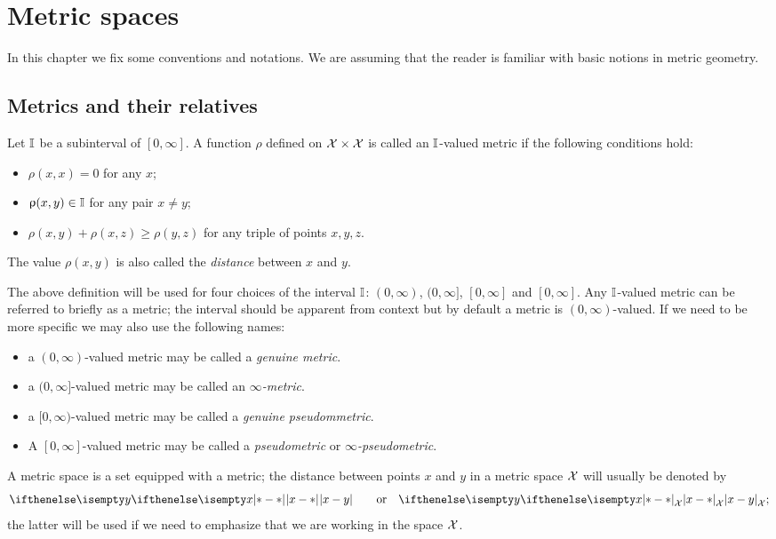 \chapter{Metric spaces}
In this chapter we fix some conventions and notations. We are assuming that the reader is familiar with basic notions in metric geometry.

\section{Metrics and their relatives}
\label{sec:metric spaces}

Let $\mathbb{I}$ be a subinterval of $[0,\infty]$.
A function $\rho$ defined on $\spc{X}\times\spc{X}$ is called an $\mathbb{I}$-valued metric if the following conditions hold:
\begin{itemize}
 \item $\rho(x,x)=0$ for any $x$;
 \item $\rho(x,y)\in \II$ for any pair $x\ne y$;
 \item $\rho(x,y)+\rho(x,z)\ge \rho(y,z)$ for any triple of points $x,y, z$.
\end{itemize}
The value $\rho(x,y)$ is also called the \emph{distance} between $x$ and $y$.


The above definition will be used for four choices of the interval $\mathbb{I}$: $(0,\infty)$, $(0,\infty]$, $[0,\infty]$ and $[0,\infty]$.
Any $\mathbb{I}$-valued metric can be referred to briefly as a metric;
the interval should be apparent from context but by default a metric is $(0,\infty)$-valued. 
If we need to be more specific we may also use the following names:
\begin{itemize}
\item a $(0,\infty)$-valued metric may be called a \emph{genuine metric}.
\item a $(0,\infty]$-valued metric may be called an \emph{$\infty$-metric}.
\item a $[0,\infty)$-valued metric may be called  a \emph{genuine pseudommetric}.
\item A $[0,\infty]$-valued metric may be called a \emph{pseudometric} or \emph{$\infty$-pseudometric}.
\end{itemize}

A metric space is a set equipped with a metric;
the distance between points $x$ and $y$ in a metric space $\mathcal{X}$ will  usually be denoted by \[\dist{x}{y}{}\qquad\text{or}\quad \dist{x}{y}{\spc{X}};\]
the latter will be used if we need to emphasize that we are working in the space $\mathcal{X}$.

